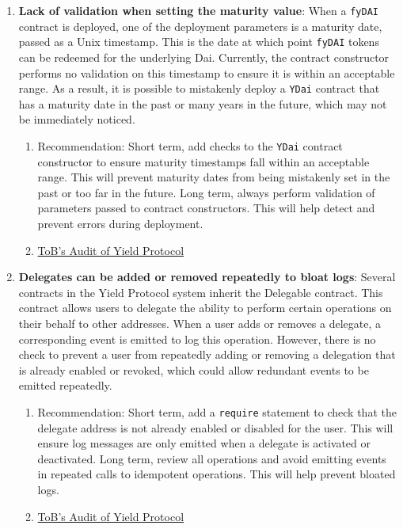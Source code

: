 \begin{enumerate}
\item\textbf{Lack of validation when setting the maturity value}: When a \verb|fyDAI| contract is deployed, one of the deployment parameters is a maturity date, passed as a Unix timestamp. This is the date at which point \verb|fyDAI| tokens can be redeemed for the underlying Dai. Currently, the contract constructor performs no validation on this timestamp to ensure it is within an acceptable range. As a result, it is possible to mistakenly deploy a \verb|YDai| contract that has a maturity date in the past or many years in the future, which may not be immediately noticed.
	\begin{enumerate}
	\item Recommendation: Short term, add checks to the \verb|YDai| contract constructor to ensure maturity timestamps fall within an acceptable range. This will prevent maturity dates from being mistakenly set in the past or too far in the future. Long term, always perform validation of parameters passed to contract constructors. This will help detect and prevent errors during deployment.
	\item\href{https://github.com/trailofbits/publications/blob/master/reviews/YieldProtocol.pdf}{ToB's Audit of Yield Protocol}
	\end{enumerate}

\item\textbf{Delegates can be added or removed repeatedly to bloat logs}: Several contracts in the Yield Protocol system inherit the Delegable contract. This contract allows users to delegate the ability to perform certain operations on their behalf to other addresses. When a user adds or removes a delegate, a corresponding event is emitted to log this operation. However, there is no check to prevent a user from repeatedly adding or removing a delegation that is already enabled or revoked, which could allow redundant events to be emitted repeatedly.
	\begin{enumerate}
	\item Recommendation: Short term, add a \verb|require| statement to check that the delegate address is not already enabled or disabled for the user. This will ensure log messages are only emitted when a delegate is activated or deactivated. Long term, review all operations and avoid emitting events in repeated calls to idempotent operations. This will help prevent bloated logs.
	\item\href{https://github.com/trailofbits/publications/blob/master/reviews/YieldProtocol.pdf}{ToB's Audit of Yield Protocol}
	\end{enumerate}


\end{enumerate}
